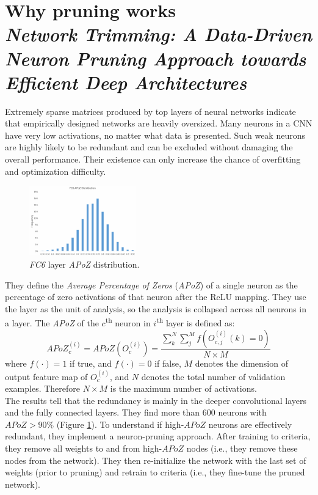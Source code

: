 \section[Why pruning works]{Why pruning works\\ \textit{Network Trimming: A Data-Driven Neuron Pruning Approach towards Efficient Deep Architectures}\\ }
Extremely sparse matrices produced by top layers of neural networks indicate that empirically designed networks are heavily oversized. Many neurons in a CNN have very low activations, no matter what data is presented. Such weak neurons are highly likely to be redundant and can be excluded without damaging the overall performance. Their existence can only increase the chance of overfitting and optimization difficulty.

\begin{figure}
  \centering
  \includegraphics[width=0.41\textwidth]{images/apoz.png}
  \caption{\textit{FC6} layer \textit{APoZ} distribution.}
  \label{fig:apoz}
\end{figure}

They define the \textit{Average Percentage of Zeros} (\textit{APoZ}) of a single neuron as the percentage of zero activations of that neuron after the ReLU mapping. They use the layer as the unit of analysis, so the analysis is collapsed across all neurons in a layer. The \textit{APoZ} of the $c$\textsuperscript{th} neuron in $i$\textsuperscript{th} layer is defined as:
\[
APoZ_c^{(i)} = APoZ(O_c^{(i)}) = \frac{\sum_k^N \sum_j^M f(O_{c,j}^{(i)}(k)=0)}{N\times M}
\]
where $f(\cdot) = 1$ if true, and $f(\cdot) = 0$ if false, $M$ denotes the dimension of output feature map of $O_c^{(i)}$, and $N$ denotes the total number of validation examples. Therefore $N\times M$ is the maximum number of activations.\\

The results tell that the redundancy is mainly in the deeper convolutional layers and the fully connected layers. They find more than 600 neurons with $APoZ > 90\%$ (Figure \ref{fig:apoz}).
To understand if high-$APoZ$ neurons are effectively redundant, they implement a neuron-pruning approach. After training to criteria, they remove all weights to and from high-$APoZ$ nodes (i.e., they remove these nodes from the network). They then re-initialize the network with the last set of weights (prior to pruning) and retrain to criteria (i.e., they fine-tune the pruned network).

